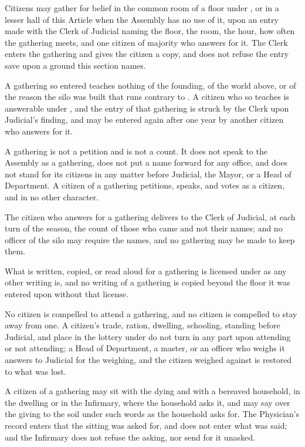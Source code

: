 \begin{clauses}
\item Citizens may gather for belief in the common room of a floor under , or in a lesser hall of this Article when the Assembly has no use of it, upon an entry made with the Clerk of Judicial naming the floor, the room, the hour, how often the gathering meets, and one citizen of majority who answers for it. The Clerk enters the gathering and gives the citizen a copy, and does not refuse the entry save upon a ground this section names.
\item A gathering so entered teaches nothing of the founding, of the world above, or of the reason the silo was built that runs contrary to . A citizen who so teaches is answerable under , and the entry of that gathering is struck by the Clerk upon Judicial's finding, and may be entered again after one year by another citizen who answers for it.
\item A gathering is not a petition and is not a count. It does not speak to the Assembly as a gathering, does not put a name forward for any office, and does not stand for its citizens in any matter before Judicial, the Mayor, or a Head of Department. A citizen of a gathering petitions, speaks, and votes as a citizen, and in no other character.
\item The citizen who answers for a gathering delivers to the Clerk of Judicial, at each turn of the season, the count of those who came and not their names; and no officer of the silo may require the names, and no gathering may be made to keep them.
\item What is written, copied, or read aloud for a gathering is licensed under  as any other writing is, and no writing of a gathering is copied beyond the floor it was entered upon without that license.
\item No citizen is compelled to attend a gathering, and no citizen is compelled to stay away from one. A citizen's trade, ration, dwelling, schooling, standing before Judicial, and place in the lottery under  do not turn in any part upon attending or not attending; a Head of Department, a master, or an officer who weighs it answers to Judicial for the weighing, and the citizen weighed against is restored to what was lost.
\item A citizen of a gathering may sit with the dying and with a bereaved household, in the dwelling or in the Infirmary, where the household asks it, and may say over the giving to the soil under  such words as the household asks for. The Physician's record enters that the sitting was asked for, and does not enter what was said; and the Infirmary does not refuse the asking, nor send for it unasked.
\end{clauses}
